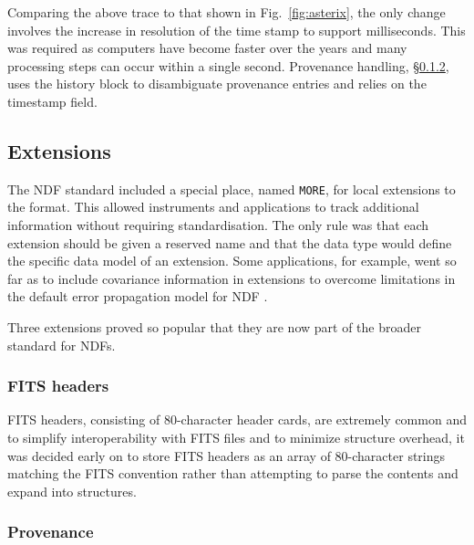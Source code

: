 \documentclass[final,authoryear,5p,times,twocolumn]{elsarticle}
\begin{document}
Comparing the above trace to that shown in Fig.~\ref{fig:asterix},
the only change involves the increase in resolution of the time
stamp to support milliseconds. This was required as computers have
become faster over the years and many processing steps can occur
within a single second. Provenance handling, \S\ref{sec:provenance},
uses the history block to disambiguate provenance entries and relies
on the timestamp field.

\subsection{Extensions}

The NDF standard included a special place, named \texttt{MORE}, for local extensions to the
format. This allowed instruments and applications to track additional
information without requiring standardisation. The only rule was that
each extension should be given a reserved name and that the data type
would define the specific data model of an extension. Some
applications, for example, went so far as to include covariance
information in extensions to overcome limitations in the default error
propagation model for NDF \citep[for example \specdre;][]{SUN140}.

Three extensions proved so popular that they are now part of the broader
standard for NDFs.

\subsubsection{FITS headers}

FITS headers, consisting of 80-character header cards, are extremely
common and to simplify interoperability with FITS files and to
minimize structure overhead, it was decided early on to store FITS
headers as an array of 80-character strings matching the FITS
convention rather than attempting to parse the contents and expand
into structures.

\subsubsection{Provenance}
\label{sec:provenance}
\end{document}
